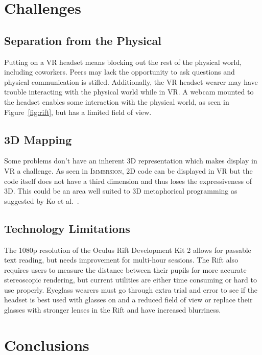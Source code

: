 \documentclass[conference]{IEEEtran}
\begin{document}
\section{Challenges}

\subsection{Separation from the Physical}
Putting on a VR headset means blocking out the rest of the physical world, including coworkers.
Peers may lack the opportunity to ask questions and physical communication is stifled.
Additionally, the VR headset wearer may have trouble interacting with the physical world while in VR.
A webcam mounted to the headset enables some interaction with the physical world, as seen in Figure~\ref{fig:rift}, but has a limited field of view.

\subsection{3D Mapping}
Some problems don't have an inherent 3D representation which makes display in VR a challenge.
As seen in \textsc{Immersion}, 2D code can be displayed in VR but the code itself does not have a third dimension and thus loses the expressiveness of 3D.
This could be an area well suited to 3D metaphorical programming as suggested by Ko et al.~\cite{Ko:LearningBarriers}.

\subsection{Technology Limitations}

The 1080p resolution of the Oculus Rift Development Kit 2 allows for passable text reading, but needs improvement for multi-hour sessions. 
The Rift also requires users to measure the distance between their pupils for more accurate stereoscopic rendering, but current utilities are either time consuming or hard to use properly.
Eyeglass wearers must go through extra trial and error to see if the headset is best used with glasses on and a reduced field of view or replace their glasses with stronger lenses in the Rift and have increased blurriness.


\section{Conclusions}
\end{document}
